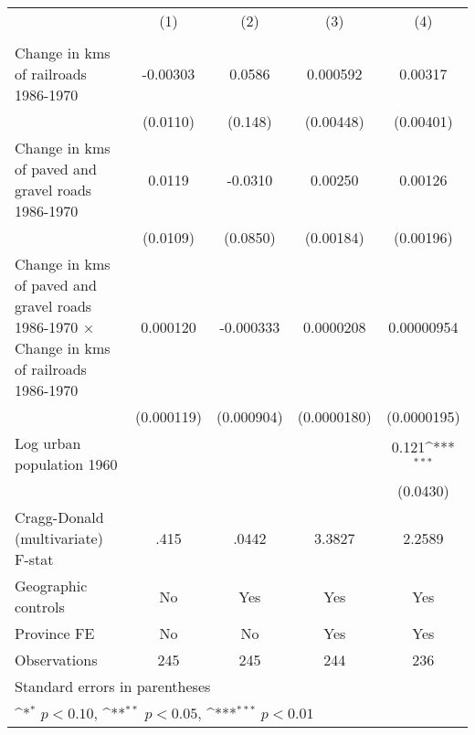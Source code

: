 {
\def\sym#1{\ifmmode^{#1}\else\(^{#1}\)\fi}
\begin{tabular}{l*{4}{c}}
\hline\hline
                &\multicolumn{1}{c}{(1)}&\multicolumn{1}{c}{(2)}&\multicolumn{1}{c}{(3)}&\multicolumn{1}{c}{(4)}\\
                &\multicolumn{1}{c}{}&\multicolumn{1}{c}{}&\multicolumn{1}{c}{}&\multicolumn{1}{c}{}\\
\hline
Change in kms of railroads 1986-1970& -0.00303         &   0.0586         & 0.000592         &  0.00317         \\
                & (0.0110)         &  (0.148)         &(0.00448)         &(0.00401)         \\
[1em]
Change in kms of paved and gravel roads 1986-1970&   0.0119         &  -0.0310         &  0.00250         &  0.00126         \\
                & (0.0109)         & (0.0850)         &(0.00184)         &(0.00196)         \\
[1em]
Change in kms of paved and gravel roads 1986-1970 $\times$ Change in kms of railroads 1986-1970& 0.000120         &-0.000333         &0.0000208         &0.00000954         \\
                &(0.000119)         &(0.000904)         &(0.0000180)         &(0.0000195)         \\
[1em]
Log urban population 1960&                  &                  &                  &    0.121\sym{***}\\
                &                  &                  &                  & (0.0430)         \\
\hline
Cragg-Donald (multivariate) F-stat&     .415         &    .0442         &   3.3827         &   2.2589         \\
Geographic controls&       No         &      Yes         &      Yes         &      Yes         \\
Province FE     &       No         &       No         &      Yes         &      Yes         \\
Observations    &      245         &      245         &      244         &      236         \\
\hline\hline
\multicolumn{5}{l}{\footnotesize Standard errors in parentheses}\\
\multicolumn{5}{l}{\footnotesize \sym{*} \(p<0.10\), \sym{**} \(p<0.05\), \sym{***} \(p<0.01\)}\\
\end{tabular}
}
